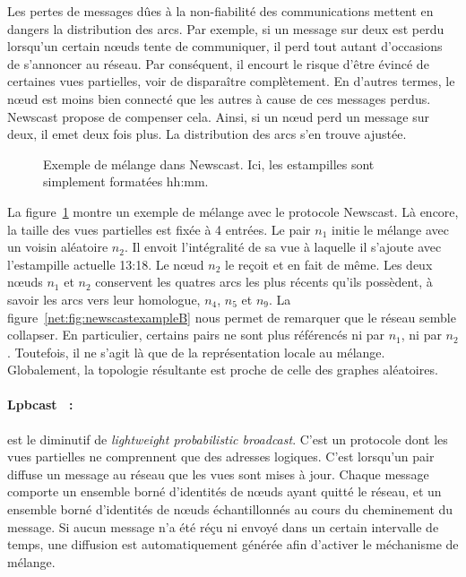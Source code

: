 \noindent Les pertes de messages dûes à la non-fiabilité des communications
mettent en dangers la distribution des arcs. Par exemple, si un message sur deux
est perdu lorsqu'un certain nœuds tente de communiquer, il perd tout autant
d'occasions de s'annoncer au réseau. Par conséquent, il encourt le risque d'être
évincé de certaines vues partielles, voir de disparaître complètement. En
d'autres termes, le nœud est moins bien connecté que les autres à cause de ces
messages perdus. Newscast propose de compenser cela. Ainsi, si un nœud perd un
message sur deux, il emet deux fois plus. La distribution des arcs s'en trouve
ajustée.

\begin{figure}
  \centering
  \hspace{35pt}
  \caption{\label{net:fig:newscastexample} Exemple de mélange dans
    Newscast. Ici, les estampilles sont simplement formatées hh:mm.}
\end{figure}

\noindent La figure~\ref{net:fig:newscastexample} montre un exemple de mélange
avec le protocole Newscast. Là encore, la taille des vues partielles est fixée à
4 entrées. Le pair $n_1$ initie le mélange avec un voisin aléatoire $n_2$. Il
envoit l'intégralité de sa vue à laquelle il s'ajoute avec l'estampille actuelle
13:18. Le nœud $n_2$ le reçoit et en fait de même. Les deux nœuds $n_1$ et $n_2$
conservent les quatres arcs les plus récents qu'ils possèdent, à savoir les arcs
vers leur homologue, $n_4$, $n_5$ et $n_9$. La
figure~\ref{net:fig:newscastexampleB} nous permet de remarquer que le réseau
semble collapser. En particulier, certains pairs ne sont plus référencés ni par
$n_1$, ni par $n_2$. Toutefois, il ne s'agit là que de la représentation locale
au mélange. Globalement, la topologie résultante est proche de celle des graphes
aléatoires.

\paragraph{Lpbcast~\cite{eugster2003lightweight} :} est le diminutif de
\emph{lightweight probabilistic broadcast}. C'est un protocole dont les vues
partielles ne comprennent que des adresses logiques. C'est lorsqu'un pair
diffuse un message au réseau que les vues sont mises à jour. Chaque message
comporte un ensemble borné d'identités de nœuds ayant quitté le réseau, et un
ensemble borné d'identités de nœuds échantillonnés au cours du cheminement du
message. Si aucun message n'a été réçu ni envoyé dans un certain intervalle de
temps, une diffusion est automatiquement générée afin d'activer le méchanisme de
mélange.

